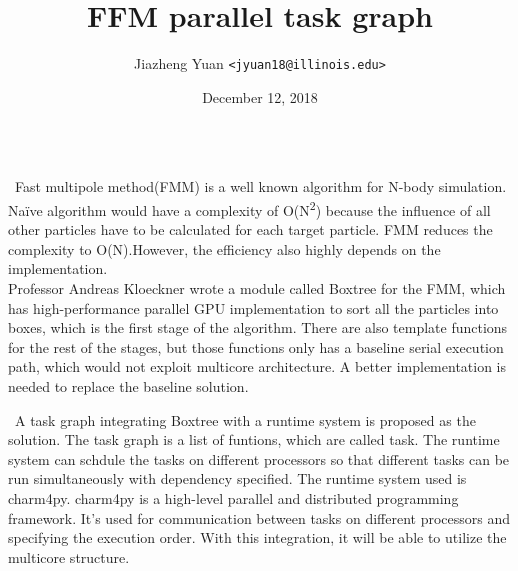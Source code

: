 \documentclass[final,t]{beamer}
\title{FFM parallel task graph}
\author{Jiazheng Yuan \texttt{<jyuan18@illinois.edu>}}
\institute{%
  Computer Science
  $\cdot$ University of Illinois
}
\date{December 12, 2018}
\begin{document}
\begin{frame}[fragile]{}
  \begin{columns}[t]


    \begin{column}{.45\linewidth}
      \begin{tcolorbox}[toplevelbox,adjusted title={Problem Statement}]
        \ Fast multipole method(FMM) is a well known algorithm for N-body simulation. Naïve algorithm would have a complexity of O(N\textsuperscript{2}) because the influence of all other particles have to be calculated for each target particle. FMM reduces the complexity to O(N).However, the efficiency also highly depends on the implementation. 
        \\  Professor Andreas Kloeckner wrote a module called Boxtree for the FMM, which has high-performance parallel GPU implementation to sort all the particles into boxes, which is the first stage of the algorithm. There are also template functions for the rest of the stages, but those functions only has a baseline serial execution path, which would not exploit multicore architecture. A better implementation is needed to replace the baseline solution.
        
      \end{tcolorbox}

      \begin{tcolorbox}[toplevelbox,adjusted title=Approach]
        \ A task graph integrating Boxtree with a runtime system is proposed as the 
          solution. The task graph is a list of funtions, which are called task. The runtime system can schdule the tasks on different processors so that different tasks can be run simultaneously with dependency specified. The runtime system
          used is charm4py. charm4py is a high-level parallel and distributed programming framework. It's used for communication between tasks on different
          processors and specifying the execution order. With this integration, it will be able to utilize the multicore structure.
      \end{tcolorbox}


\end{column}
\end{columns}
\end{frame}
\end{document}
